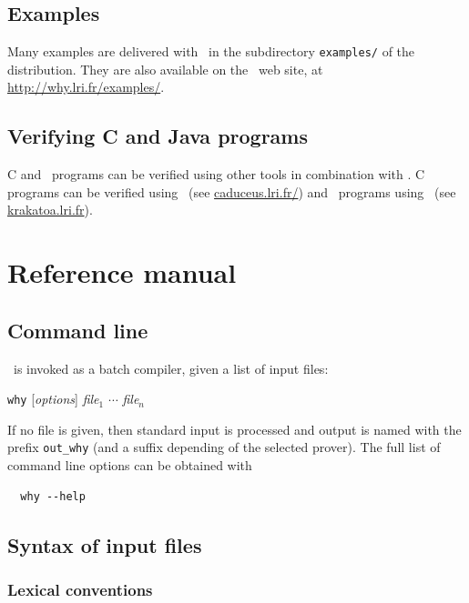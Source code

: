 \documentclass[a4paper,12pt]{report}
\begin{document}
\section{Examples}
\label{examples}

Many examples are delivered with \why\ in the
subdirectory \texttt{examples/} of the distribution.
They are also available on the \why\ web site, at
\url{http://why.lri.fr/examples/}.


\section{Verifying C and Java programs}
\label{CandJava}

C and \java\ programs can be verified using other tools in combination
with \why. C programs can be verified using \caduceus\ (see
\url{caduceus.lri.fr/}) and \java\ programs using \krakatoa\ (see
\url{krakatoa.lri.fr}). 


\chapter{Reference manual}
\label{refman}


\section{Command line}
\label{usage}

\why\ is invoked as a batch compiler, given a list of input files:
\begin{center}
  \texttt{why} [\textit{options}] \textit{file}$_1$ $\cdots$ \textit{file}$_n$
\end{center}
If no file is given, then standard input is processed and output is
named with the prefix \texttt{out\_why} (and a suffix depending of the
selected prover).
The full list of command line options can be obtained with
\begin{verbatim}
  why --help
\end{verbatim}



\section{Syntax of input files}
\label{syntax}

\subsection{Lexical conventions}
\end{document}
